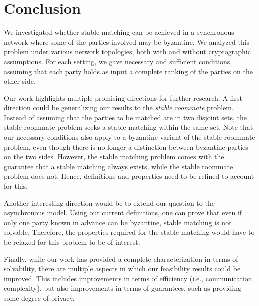 \section{Conclusion}

We investigated whether stable matching can be achieved in a synchronous network where some of the parties involved may be byzantine. We analyzed this problem under various network topologies, both with and without cryptographic assumptions. For each setting, we gave necessary and sufficient conditions,  assuming that each party holds as input a complete ranking of the parties on the other side.


Our work highlights multiple promising directions for further research. A first direction could be generalizing our results to the \emph{stable roommate} problem. Instead of assuming that the parties to be matched are in two disjoint sets, the stable roommate problem seeks a stable matching within the same set. Note that our necessary conditions also apply to a byzantine variant of the stable roommate problem, even though there is no longer a distinction between byzantine parties on the two sides. However, the stable matching problem comes with the guarantee that a stable matching always exists, while the stable roommate problem does not. Hence, definitions and properties need to be refined to account for this.

Another interesting direction would be to extend our question to the asynchronous model. Using our current definitions, one can prove that even if only one party known in advance can be byzantine, stable matching is not solvable. Therefore, the properties required for the stable matching would have to be relaxed for this problem to be of interest.

Finally, while our work has provided a complete characterization in terms of solvability, there are multiple aspects in which our feasibility results could be improved. This includes improvements in terms of efficiency (i.e., communication complexity), but also improvements in terms of guarantees, such as providing some degree of privacy. 




